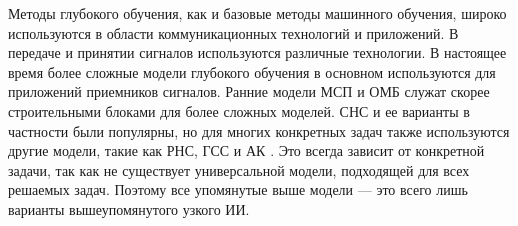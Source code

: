 
\FloatBarrier

Методы глубокого обучения, как и базовые методы машинного обучения, широко используются в области коммуникационных технологий и приложений. В передаче и принятии сигналов используются различные технологии. В настоящее время более сложные модели глубокого обучения в основном используются для приложений приемников сигналов. Ранние модели МСП и ОМБ служат скорее строительными блоками для более сложных моделей. СНС и ее варианты \cite{quavdeeplearn} в частности были популярны, но для многих конкретных задач также используются другие модели, такие как РНС, ГСС и АК \cite{mitigatingdeeplearn}. Это всегда зависит от конкретной задачи, так как не существует универсальной модели, подходящей для всех решаемых задач. Поэтому все упомянутые выше модели — это всего лишь варианты вышеупомянутого узкого ИИ.